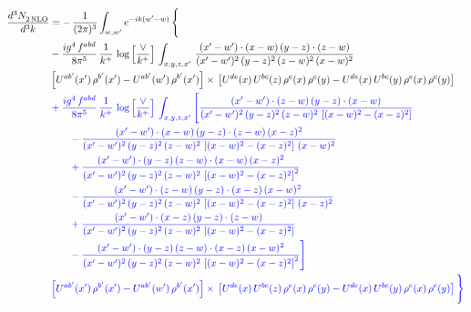 \documentclass[9pt]{article}
\newcommand{\nc}{\color{blue}}
\numberwithin{equation}{section}
\begin{document}
\begin{align}
   \frac{d^{3}N_{2\,\rm NLO}^{\rm}}{d^{3}k}  & = -\,\frac{1}{(2\pi)^{3}}  \int_{w, w^\prime} e^{-ik(w^\prime-w)}\, \Bigg\{\notag \\ &  -\frac{ig^{4}\, f^{abd}}{8\pi^{5}}\, \frac{1}{k^{+}}\, \log{\left[\frac{\vee}{ k^{+}}\right]}\,\int_{x,y,z,x'}\,\frac{(x'-w')\cdot (x-w)\, (y-z)\cdot (z-w)}{(x'-w')^{2}\, (y-z)^{2}\, (z-w)^{2}\,(x-w)^{2}}\, \notag \\ & \left[U^{ab'}(x')\,\rho^{b'}(x')-U^{ab'}(w')\, \rho^{b'}(x')\right]\times\,\left[U^{de}(x)\,U^{bc}(z)\, \rho^{e}(x)\,\rho^{c}(y)-U^{de}(x)\,U^{bc}(y)\,\rho^{e}(x)\,\rho^{c}(y)\right]\notag \\ & \nc +\frac{ig^{4}\, f^{abd}}{8\pi^{5}}\, \frac{1}{k^{+}}\,\log{\left[\frac{\vee}{k^{+}}\right]}\,\int_{x,y,z,x'}\Bigg[\frac{(x'-w')\cdot (z-w)\, (y-z)\cdot (x-w)}{(x'-w')^{2}\, (y-z)^{2}\, (z-w)^{2}\,\left[(x-w)^{2}-(x-z)^{2}\right]}\notag \\ & \nc \qquad-\frac{(x'-w')\cdot (x-w)\, (y-z)\cdot (z-w)\,(x-z)^{2}}{(x'-w')^{2}\, (y-z)^{2}\, (z-w)^{2}\,\left[(x-w)^{2}-(x-z)^{2}\right]\,(x-w)^{2}}\notag \\ & \nc \qquad+\frac{(x'-w')\cdot (y-z)\, (z-w)\cdot (x-w)\,(x-z)^{2}}{(x'-w')^{2}\, (y-z)^{2}\, (z-w)^{2}\,\left[(x-w)^{2}-(x-z)^{2}\right]^{2}}\notag \\ & \nc \qquad-\frac{(x'-w')\cdot (z-w)\, (y-z)\cdot (x-z)\,(x-w)^{2}}{(x'-w')^{2}\, (y-z)^{2}\, (z-w)^{2}\,\left[(x-w)^{2}-(x-z)^{2}\right]\,(x-z)^{2}}\notag \\ & \nc \qquad+\frac{(x'-w')\cdot (x-z)\, (y-z)\cdot (z-w)}{(x'-w')^{2}\, (y-z)^{2}\, (z-w)^{2}\,\left[(x-w)^{2}-(x-z)^{2}\right]}\notag \\ & \nc \qquad-\frac{(x'-w')\cdot (y-z)\, (z-w)\cdot (x-z)\,(x-w)^{2}}{(x'-w')^{2}\, (y-z)^{2}\, (z-w)^{2}\,\left[(x-w)^{2}-(x-z)^{2}\right]^{2}}\Bigg]\notag \\ & \nc \left[U^{ab'}(x')\,\rho^{b'}(x')-U^{ab'}(w')\, \rho^{b'}(x')\right]\times\, \left[U^{de}(x)\,U^{bc}(z)\, \rho^{e}(x)\,\rho^{c}(y)-U^{de}(x)\,U^{bc}(y)\,\rho^{e}(x)\,\rho^{c}(y)\right]\Bigg\} 
\end{align}   
\end{document}

